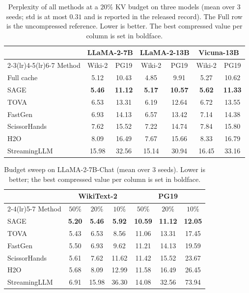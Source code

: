 \begin{table}[t]
\centering
\caption{Perplexity of all methods at a $20\%$ KV budget on three
models (mean over 3 seeds; std is at most $0.31$ and is reported in
the released record). The Full row is the uncompressed reference.
Lower is better. The best compressed value per column is set in
boldface.}
\label{tab:main}
\small
\begin{tabular*}{\textwidth}{@{\extracolsep{\fill}} l cccccc}
\toprule
& \multicolumn{2}{c}{LLaMA-2-7B} & \multicolumn{2}{c}{LLaMA-2-13B}
& \multicolumn{2}{c}{Vicuna-13B} \\
\cmidrule(lr){2-3}\cmidrule(lr){4-5}\cmidrule(lr){6-7}
Method & Wiki-2 & PG19 & Wiki-2 & PG19 & Wiki-2 & PG19 \\
\midrule
Full cache   & 5.12 & 10.43 & 4.85 & 9.91 & 5.27 & 10.62 \\
SAGE         & \textbf{5.46} & \textbf{11.12} & \textbf{5.17} & \textbf{10.57} & \textbf{5.62} & \textbf{11.33} \\
TOVA         & 6.53 & 13.31 & 6.19 & 12.64 & 6.72 & 13.55 \\
FastGen      & 6.93 & 14.13 & 6.57 & 13.42 & 7.14 & 14.38 \\
ScissorHands & 7.62 & 15.52 & 7.22 & 14.74 & 7.84 & 15.80 \\
H2O          & 8.09 & 16.49 & 7.67 & 15.66 & 8.33 & 16.79 \\
StreamingLLM & 15.98 & 32.56 & 15.14 & 30.94 & 16.45 & 33.16 \\
\bottomrule
\end{tabular*}
\end{table}

\begin{table}[t]
\centering
\caption{Budget sweep on LLaMA-2-7B-Chat (mean over 3 seeds). Lower is
better; the best compressed value per column is set in boldface.}
\label{tab:sweep}
\small
\begin{tabular*}{0.86\textwidth}{@{\extracolsep{\fill}} l ccc ccc}
\toprule
& \multicolumn{3}{c}{WikiText-2} & \multicolumn{3}{c}{PG19} \\
\cmidrule(lr){2-4}\cmidrule(lr){5-7}
Method & $50\%$ & $20\%$ & $10\%$ & $50\%$ & $20\%$ & $10\%$ \\
\midrule
SAGE         & \textbf{5.20} & \textbf{5.46} & \textbf{5.92} & \textbf{10.59} & \textbf{11.12} & \textbf{12.05} \\
TOVA         & 5.43 & 6.53 & 8.56 & 11.06 & 13.31 & 17.45 \\
FastGen      & 5.50 & 6.93 & 9.62 & 11.21 & 14.13 & 19.59 \\
ScissorHands & 5.61 & 7.62 & 11.62 & 11.42 & 15.52 & 23.67 \\
H2O          & 5.68 & 8.09 & 12.99 & 11.58 & 16.49 & 26.45 \\
StreamingLLM & 6.91 & 15.98 & 36.30 & 14.08 & 32.56 & 73.94 \\
\bottomrule
\end{tabular*}
\end{table}

